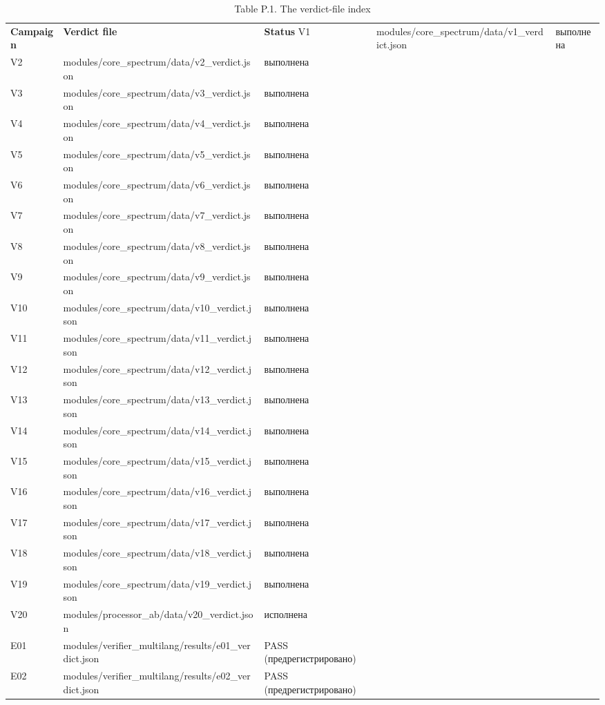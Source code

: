 \documentclass[11pt,a4paper]{article}
\begin{document}
\begin{table}[htbp]\centering\small
\caption{Table P.1. The verdict-file index}
\begin{tabular}{p{} p{} p{}}
\toprule
\textbf{Campaign} & \textbf{Verdict file} & \textbf{Status}
\midrule
V1 & modules/core\_spectrum/data/v1\_verdict.json & выполнена \\
V2 & modules/core\_spectrum/data/v2\_verdict.json & выполнена \\
V3 & modules/core\_spectrum/data/v3\_verdict.json & выполнена \\
V4 & modules/core\_spectrum/data/v4\_verdict.json & выполнена \\
V5 & modules/core\_spectrum/data/v5\_verdict.json & выполнена \\
V6 & modules/core\_spectrum/data/v6\_verdict.json & выполнена \\
V7 & modules/core\_spectrum/data/v7\_verdict.json & выполнена \\
V8 & modules/core\_spectrum/data/v8\_verdict.json & выполнена \\
V9 & modules/core\_spectrum/data/v9\_verdict.json & выполнена \\
V10 & modules/core\_spectrum/data/v10\_verdict.json & выполнена \\
V11 & modules/core\_spectrum/data/v11\_verdict.json & выполнена \\
V12 & modules/core\_spectrum/data/v12\_verdict.json & выполнена \\
V13 & modules/core\_spectrum/data/v13\_verdict.json & выполнена \\
V14 & modules/core\_spectrum/data/v14\_verdict.json & выполнена \\
V15 & modules/core\_spectrum/data/v15\_verdict.json & выполнена \\
V16 & modules/core\_spectrum/data/v16\_verdict.json & выполнена \\
V17 & modules/core\_spectrum/data/v17\_verdict.json & выполнена \\
V18 & modules/core\_spectrum/data/v18\_verdict.json & выполнена \\
V19 & modules/core\_spectrum/data/v19\_verdict.json & выполнена \\
V20 & modules/processor\_ab/data/v20\_verdict.json & исполнена \\
E01 & modules/verifier\_multilang/results/e01\_verdict.json & PASS (предрегистрировано) \\
E02 & modules/verifier\_multilang/results/e02\_verdict.json & PASS (предрегистрировано) \\

\end{tabular}
\end{table}
\end{document}
